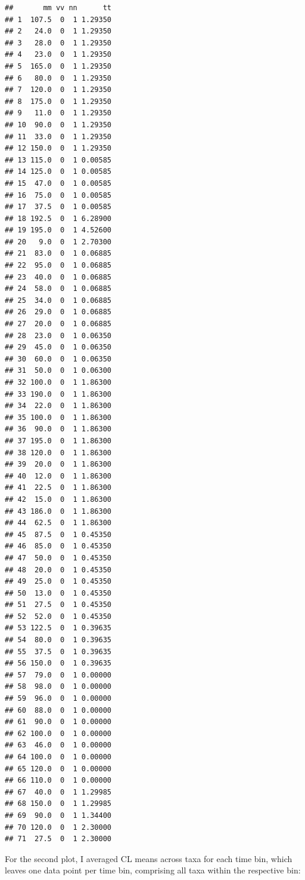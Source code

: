 \documentclass[]{article}
\begin{document}
\begin{verbatim}
##       mm vv nn      tt
## 1  107.5  0  1 1.29350
## 2   24.0  0  1 1.29350
## 3   28.0  0  1 1.29350
## 4   23.0  0  1 1.29350
## 5  165.0  0  1 1.29350
## 6   80.0  0  1 1.29350
## 7  120.0  0  1 1.29350
## 8  175.0  0  1 1.29350
## 9   11.0  0  1 1.29350
## 10  90.0  0  1 1.29350
## 11  33.0  0  1 1.29350
## 12 150.0  0  1 1.29350
## 13 115.0  0  1 0.00585
## 14 125.0  0  1 0.00585
## 15  47.0  0  1 0.00585
## 16  75.0  0  1 0.00585
## 17  37.5  0  1 0.00585
## 18 192.5  0  1 6.28900
## 19 195.0  0  1 4.52600
## 20   9.0  0  1 2.70300
## 21  83.0  0  1 0.06885
## 22  95.0  0  1 0.06885
## 23  40.0  0  1 0.06885
## 24  58.0  0  1 0.06885
## 25  34.0  0  1 0.06885
## 26  29.0  0  1 0.06885
## 27  20.0  0  1 0.06885
## 28  23.0  0  1 0.06350
## 29  45.0  0  1 0.06350
## 30  60.0  0  1 0.06350
## 31  50.0  0  1 0.06300
## 32 100.0  0  1 1.86300
## 33 190.0  0  1 1.86300
## 34  22.0  0  1 1.86300
## 35 100.0  0  1 1.86300
## 36  90.0  0  1 1.86300
## 37 195.0  0  1 1.86300
## 38 120.0  0  1 1.86300
## 39  20.0  0  1 1.86300
## 40  12.0  0  1 1.86300
## 41  22.5  0  1 1.86300
## 42  15.0  0  1 1.86300
## 43 186.0  0  1 1.86300
## 44  62.5  0  1 1.86300
## 45  87.5  0  1 0.45350
## 46  85.0  0  1 0.45350
## 47  50.0  0  1 0.45350
## 48  20.0  0  1 0.45350
## 49  25.0  0  1 0.45350
## 50  13.0  0  1 0.45350
## 51  27.5  0  1 0.45350
## 52  52.0  0  1 0.45350
## 53 122.5  0  1 0.39635
## 54  80.0  0  1 0.39635
## 55  37.5  0  1 0.39635
## 56 150.0  0  1 0.39635
## 57  79.0  0  1 0.00000
## 58  98.0  0  1 0.00000
## 59  96.0  0  1 0.00000
## 60  88.0  0  1 0.00000
## 61  90.0  0  1 0.00000
## 62 100.0  0  1 0.00000
## 63  46.0  0  1 0.00000
## 64 100.0  0  1 0.00000
## 65 120.0  0  1 0.00000
## 66 110.0  0  1 0.00000
## 67  40.0  0  1 1.29985
## 68 150.0  0  1 1.29985
## 69  90.0  0  1 1.34400
## 70 120.0  0  1 2.30000
## 71  27.5  0  1 2.30000
\end{verbatim}

For the second plot, I averaged CL means across taxa for each time bin,
which leaves one data point per time bin, comprising all taxa within the
respective bin:
\end{document}
